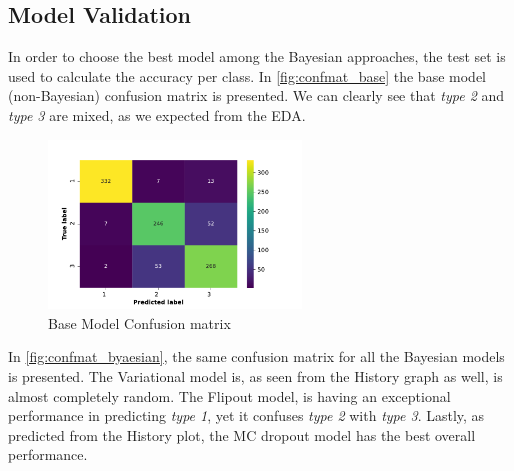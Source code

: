 \documentclass[11pt,twoside]{article}
\numberwithin{Theorem}{section}
\numberwithin{Definition}{section}
\numberwithin{Lemma}{section}
\numberwithin{Algorithm}{section}
\numberwithin{equation}{section}
\begin{document}
\subsection{Model Validation}
\label{sec:validation}
In order to choose the best model among the Bayesian approaches, the test set is used to calculate the accuracy per class. In \autoref{fig:confmat_base} the base model (non-Bayesian) confusion matrix is presented. We can clearly see that \textit{type 2} and \textit{type 3} are mixed, as we expected from the EDA.
\vspace*{1em}
\begin{figure}[!h]
\centering
\includegraphics[width=0.6\textwidth]{./output/2.e.confmat-base.pdf}
\caption{Base Model Confusion matrix}
\label{fig:confmat_base}
\end{figure}
\vspace{2em}
In \autoref{fig:confmat_byaesian}, the same confusion matrix for all the Bayesian models is presented. The Variational model is, as seen from the History graph as well, is almost completely random. The Flipout model, is having an exceptional performance in predicting \textit{type 1}, yet it confuses \textit{type 2} with \textit{type 3}. Lastly, as predicted from the History plot, the MC dropout model has the best overall performance.
\end{document}
